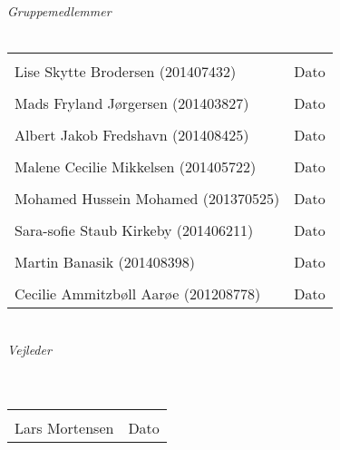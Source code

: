 \begin{vplace}[0.6]
{\large \textit{Gruppemedlemmer}}
\\
\\

\noindent \begin{tabular}{ll}
	\makebox[3.0in]{\hrulefill} & \makebox[1.5in]{\hrulefill}\\
	Lise Skytte Brodersen (201407432) & Dato\\[7ex]%
	\makebox[3in]{\hrulefill} & \makebox[1.5in]{\hrulefill}\\
	Mads Fryland J\o rgersen (201403827) & Dato\\[7ex]
	\makebox[3in]{\hrulefill} & \makebox[1.5in]{\hrulefill}\\
	Albert Jakob Fredshavn (201408425) & Dato\\[7ex]
	\makebox[3in]{\hrulefill} & \makebox[1.5in]{\hrulefill}\\
	Malene Cecilie Mikkelsen (201405722) & Dato\\[7ex]
	\makebox[3in]{\hrulefill} & \makebox[1.5in]{\hrulefill}\\
	Mohamed Hussein Mohamed (201370525) & Dato\\[7ex]
	\makebox[3in]{\hrulefill} & \makebox[1.5in]{\hrulefill}\\
	Sara-sofie Staub Kirkeby (201406211) & Dato\\[7ex]
	\makebox[3in]{\hrulefill} & \makebox[1.5in]{\hrulefill}\\
	Martin Banasik (201408398) & Dato\\[7ex]
	\makebox[3in]{\hrulefill} & \makebox[1.5in]{\hrulefill}\\
	Cecilie Ammitzb\o ll Aar\o e (201208778) & Dato\\[7ex]
	
\end{tabular}
\\
{\large \textit{Vejleder}}
\\
\\
\\
\noindent \begin{tabular}{ll}
	\makebox[3.0in]{\hrulefill} & \makebox[1.5in]{\hrulefill}\\
	Lars Mortensen & Dato\\[8ex]
\end{tabular}
\end{vplace}
